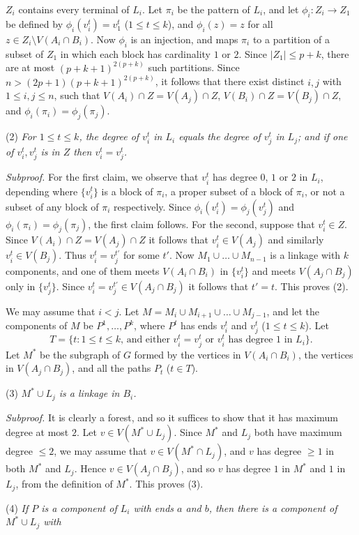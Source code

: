 \noindent $Z_i$ contains every terminal of $L_i$. Let $\pi_i$ be the pattern of $L_i$, and let $\phi_i \colon Z_i \to Z_1$ be defined by $\phi_i(v_i^t) = v_1^t$ ($1 \le t \le k$), and $\phi_i(z) = z$ for all $z \in Z_i \setminus V(A_i \cap B_i)$. Now $\phi_i$ is an injection, and maps $\pi_i$ to a partition of a subset of $Z_1$ in which each block has cardinality $1$ or $2$. Since $|Z_1| \le p + k$, there are at most $(p+k+1)^{2(p+k)}$ such partitions. Since $n > (2p+1)(p+k+1)^{2(p+k)}$, it follows that there exist distinct $i, j$ with $1 \le i, j \le n$, such that $V(A_i) \cap Z = V(A_j) \cap Z$, $V(B_i) \cap Z = V(B_j) \cap Z$, and $\phi_i(\pi_i) = \phi_j(\pi_j)$.

\hspace*{12pt}(2) \textit{For $1 \le t \le k$, the degree of $v_i^t$ in $L_i$ equals the degree of $v_j^t$ in $L_j$; and if one of $v_i^t, v_j^t$ is in $Z$ then $v_i^t = v_j^t$.}

\textit{Subproof.} For the first claim, we observe that $v_i^t$ has degree $0$, $1$ or $2$ in $L_i$, depending where $\{v_i^t\}$ is a block of $\pi_i$, a proper subset of a block of $\pi_i$, or not a subset of any block of $\pi_i$ respectively. Since $\phi_i(v_i^t) = \phi_j(v_j^t)$ and $\phi_i(\pi_i) = \phi_j(\pi_j)$, the first claim follows. For the second, suppose that $v_i^t \in Z$. Since $V(A_i) \cap Z = V(A_j) \cap Z$ it follows that $v_i^t \in V(A_j)$ and similarly $v_i^t \in V(B_j)$. Thus $v_i^t = v_j^{t'}$ for some $t'$. Now $M_1 \cup \dots \cup M_{n-1}$ is a linkage with $k$ components, and one of them meets $V(A_i \cap B_i)$ in $\{v_i^t\}$ and meets $V(A_j \cap B_j)$ only in $\{v_j^t\}$. Since $v_i^t = v_j^{t'} \in V(A_j \cap B_j)$ it follows that $t' = t$. This proves (2).

We may assume that $i < j$. Let $M = M_i \cup M_{i+1} \cup \dots \cup M_{j-1}$, and let the components of $M$ be $P^1, \dots, P^k$, where $P^t$ has ends $v_i^t$ and $v_j^t$ ($1 \le t \le k$). Let
\begin{equation*}
T = \{t : 1 \le t \le k\text{, and either } v_i^t = v_j^t \text{ or } v_i^t \text{ has degree } 1 \text{ in } L_i\}.
\end{equation*}
Let $M^*$ be the subgraph of $G$ formed by the vertices in $V(A_i \cap B_i)$, the vertices in $V(A_j \cap B_j)$, and all the paths $P_t$ ($t \in T$).

\hspace*{12pt}(3) \textit{$M^* \cup L_j$ is a linkage in $B_i$.}

\textit{Subproof.} It is clearly a forest, and so it suffices to show that it has maximum degree at most $2$. Let $v \in V(M^* \cup L_j)$. Since $M^*$ and $L_j$ both have maximum degree $\le 2$, we may assume that $v \in V(M^* \cap L_j)$, and $v$ has degree $\ge 1$ in both $M^*$ and $L_j$. Hence $v \in V(A_j \cap B_j)$, and so $v$ has degree $1$ in $M^*$ and $1$ in $L_j$, from the definition of $M^*$. This proves (3).

\hspace*{12pt}(4) \textit{If $P$ is a component of $L_i$ with ends $a$ and $b$, then there is a component of $M^* \cup L_j$ with}

